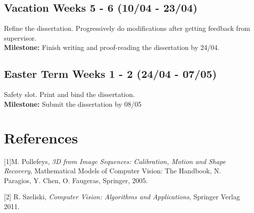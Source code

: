 \subsection*{Vacation Weeks 5 - 6 (10/04 - 23/04)}
Refine the dissertation. Progressively do modifications after getting feedback from supervisor.\\
{\bf Milestone:} Finish writing and proof-reading the dissertation by 24/04.

\subsection*{Easter Term Weeks 1 - 2 (24/04 - 07/05)}  
Safety slot. Print and bind the dissertation.\\
{\bf Milestone:} Submit the dissertation by 08/05

\section*{References}

\begin{description}

\item{[1]}M. Pollefeys, \emph{3D from Image Sequences: Calibration, Motion and Shape Recovery}, Mathematical Models of Computer Vision: The Handbook, N. Paragios, Y. Chen, O. Faugeras, Springer, 2005.

\item{[2]} R. Szeliski, \emph{Computer Vision: Algorithms and Applications}, Springer Verlag 2011.
\end{description}

